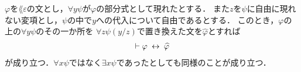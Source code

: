 	\begin{screen}
		\begin{logicalthm}[束縛された変項を取り替えても同値]
		\label{logicalthm:equivalence_by_replacing_bound_variables}
			$\varphi$を$\lang{\varepsilon}$の文とし，$\forall y \psi$が$\varphi$の部分式として現れたとする．
			また$z$を$\psi$に自由に現れない変項とし，$\psi$の中で$y$への代入について自由であるとする．
			このとき，$\varphi$の上の$\forall y \psi$のその一か所を
			$\forall z \psi(y/z)$で置き換えた文を$\widehat{\varphi}$とすれば
			\begin{align}
				\vdash \varphi \hspace{0.25em}\leftrightarrow\hspace{0.25em} \widehat{\varphi}
			\end{align}
			が成り立つ．$\forall x \psi$ではなく$\exists x \psi$であったとしても同様のことが成り立つ．
		\end{logicalthm}
	\end{screen}
	
